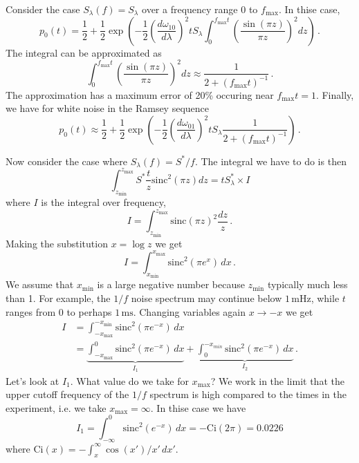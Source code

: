 Consider the case $S_{\lambda}(f) = S_{\lambda}$ over a frequency range $0$ to $f_\text{max}$.
In thise case,
\begin{equation}
  p_0(t) = \frac{1}{2} + \frac{1}{2}\exp \left( -\frac{1}{2}\left( \frac{d\omega_{10}}{d\lambda} \right)^2 t S_{\lambda} \int_0^{f_\text{max}t} \left( \frac{\sin(\pi z)} {\pi z} \right)^2 dz \right) \, .
\end{equation}
The integral can be approximated as
\begin{equation}
  \int_0^{f_\text{max}t} \left( \frac{\sin(\pi z)}{\pi z} \right)^2 dz \approx \frac{1}{2+(f_{\text{max}}t)^{-1}} \, .
\end{equation}
The approximation has a maximum error of 20\% occuring near $f_{\text{max}}t = 1$. 
Finally, we have for white noise in the Ramsey sequence
\begin{equation}
  p_0(t) \approx \frac{1}{2} + \frac{1}{2} \exp \left( -\frac{1}{2} \left( \frac{d\omega_{01}}{d\lambda} \right)^2 t S_{\lambda} \frac{1}{2 + (f_{\text{max}}t)^{-1}} \right) \, .
\end{equation}



Now consider the case where $S_{\lambda}(f)=S^{*}/f$.
The integral we have to do is then
\begin{equation}
  \int_{z_\text{min}}^{z_\text{max}}S^{*}\frac{t}{z}\text{sinc}^2 \left(\pi z \right) dz
  = t S^*_\lambda \times I
\end{equation}
where $I$ is the integral over frequency,
\begin{equation}
  I = \int_{z_{\text{min}}}^{z_{\text{max}}} \text{sinc}(\pi z)^{2}\frac{dz}{z} \, .
\end{equation}
Making the substitution $x=\log z$ we get
\begin{equation}
  I = \int_{x_\text{min}}^{x_\text{max}}\text{sinc}^2(\pi e^{x})\, dx \, .
\end{equation}
We assume that $x_\text{min}$ is a large negative number because $z_\text{min}$ typically much less than 1.
For example, the $1/f$ noise spectrum may continue below $1\,\text{mHz}$, while $t$ ranges from $0$ to perhaps $1\,\text{ms}$.
Changing variables again $x \rightarrow -x$ we get
\begin{align}
  I & = \int_{-x_\text{max}}^{-x_\text{min}}\text{sinc}^2 \left(\pi e^{-x}\right) \, dx\\
  & = \underbrace{\int_{-x_\text{max}}^0\text{sinc}^{2}\left(\pi e^{-x}\right)\, dx}_{I_1} + \underbrace{\int_0^{-x_{min}}\text{sinc}^2 \left(\pi e^{-x}\right) \, dx}_{I_2} \, .
\end{align}
Let's look at $I_1$.
What value do we take for $x_\text{max}$?
We work in the limit that the upper cutoff frequency of the $1/f$ spectrum is high compared to the times in the experiment, i.e. we take $x_\text{max}=\infty$.
In thise case we have
\begin{equation}
  I_1 = \int_{-\infty}^{0}\textrm{sinc}^{2}\left(e^{-x}\right)\, dx = -\text{Ci}(2\pi)=0.0226
\end{equation}
where $\text{Ci}(x) = -\int_{x}^{\infty}\cos(x')/x'\, dx'$.


